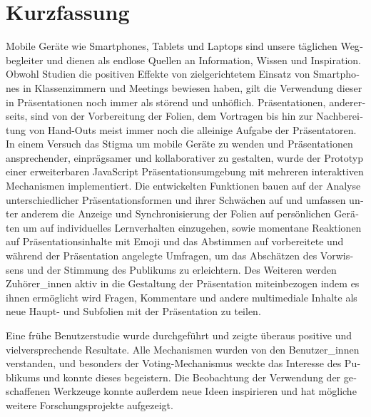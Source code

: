 \chapter{Kurzfassung}

\begin{german}
Mobile Geräte wie Smartphones, Tablets und Laptops sind unsere täglichen Wegbegleiter und dienen als endlose Quellen an Information, Wissen und Inspiration. Obwohl Studien die positiven Effekte von zielgerichtetem Einsatz von Smartphones in Klassenzimmern und Meetings bewiesen haben, gilt die Verwendung dieser in Präsentationen noch immer als störend und unhöflich. Präsentationen, andererseits, sind von der Vorbereitung der Folien, dem Vortragen bis hin zur Nachbereitung von Hand-Outs meist immer noch die alleinige Aufgabe der Präsentatoren. In einem Versuch das Stigma um mobile Geräte zu wenden und Präsentationen ansprechender, einprägsamer und kollaborativer zu gestalten, wurde der Prototyp einer erweiterbaren JavaScript Präsentationsumgebung mit mehreren interaktiven Mechanismen implementiert. Die entwickelten Funktionen bauen auf der Analyse unterschiedlicher Präsentationsformen und ihrer Schwächen auf und umfassen unter anderem die Anzeige und Synchronisierung der Folien auf persönlichen Geräten um auf individuelles Lernverhalten einzugehen, sowie momentane Reaktionen auf Präsentationsinhalte mit Emoji und das Abstimmen auf vorbereitete und während der Präsentation angelegte Umfragen, um das Abschätzen des Vorwissens und der Stimmung des Publikums zu erleichtern. Des Weiteren werden Zuhörer\_innen aktiv in die Gestaltung der Präsentation miteinbezogen indem es ihnen ermöglicht wird Fragen, Kommentare und andere multimediale Inhalte als neue Haupt- und Subfolien mit der Präsentation zu teilen.

Eine frühe Benutzerstudie wurde durchgeführt und zeigte überaus positive und vielversprechende Resultate. Alle Mechanismen wurden von den Benutzer\_innen verstanden, und besonders der Voting-Mechanismus weckte das Interesse des Publikums und konnte dieses begeistern. Die Beobachtung der Verwendung der geschaffenen Werkzeuge konnte außerdem neue Ideen inspirieren und hat mögliche weitere Forschungsprojekte aufgezeigt.
\end{german}